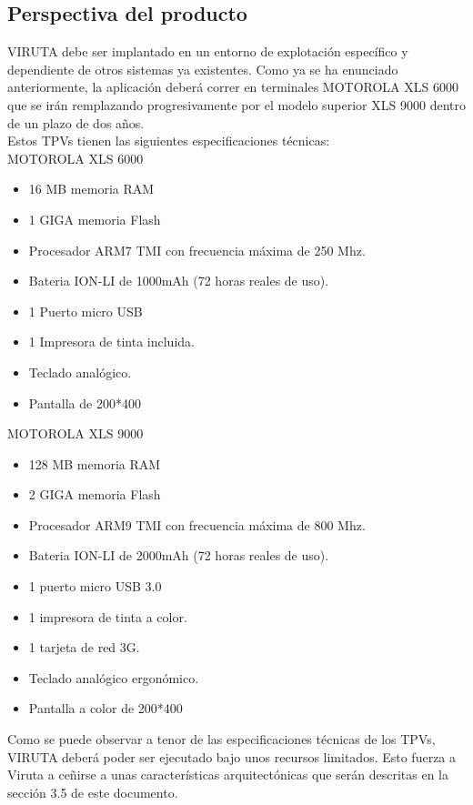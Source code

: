 \subsection{Perspectiva del producto}

\color{red}

VIRUTA debe ser implantado en un entorno de explotación específico y dependiente de otros sistemas ya existentes. Como ya se ha enunciado anteriormente, la aplicación deberá correr en terminales MOTOROLA XLS 6000 que se irán remplazando progresivamente por el modelo superior XLS 9000 dentro de un plazo de dos años.\\

Estos TPVs tienen las siguientes especificaciones técnicas:\\


{\Large MOTOROLA XLS 6000}
\begin{itemize}
\item 16 MB memoria RAM
\item 1 GIGA memoria Flash
\item Procesador ARM7 TMI con frecuencia máxima de 250 Mhz.
\item Bateria ION-LI de 1000mAh (72 horas reales de uso).
\item 1 Puerto micro USB
\item 1 Impresora de tinta incluida.
\item Teclado analógico.
\item Pantalla de 200*400
\end{itemize}

{\Large MOTOROLA XLS 9000}
\begin{itemize}
\item 128 MB memoria RAM
\item 2 GIGA memoria Flash
\item Procesador ARM9 TMI con frecuencia máxima de 800 Mhz.
\item Bateria ION-LI de 2000mAh (72 horas reales de uso).
\item 1 puerto micro USB 3.0
\item 1 impresora de tinta a color.
\item 1 tarjeta de red 3G.
\item Teclado analógico ergonómico.
\item Pantalla a color de 200*400
\end{itemize}

\color{black}

Como se puede observar a tenor de las especificaciones técnicas de los TPVs, \color{red} VIRUTA deberá poder ser ejecutado bajo unos recursos limitados. \color{black} Esto fuerza a Viruta a ceñirse a unas características arquitectónicas que serán descritas en la sección 3.5 de este documento.\\

